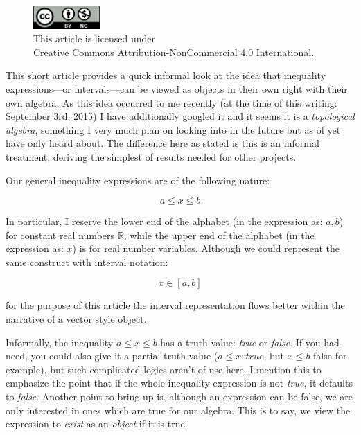 \documentclass[twoside]{article}
\begin{document}
\begin{figure}[h]
\centering
\includegraphics[width=1in]{../../../cc-by-nc.png}\\[0.1in]
\tiny This article is licensed under \\
\href{http://creativecommons.org/licenses/by-nc/4.0/}
{Creative Commons Attribution-NonCommercial 4.0 International.}\\[0.3in]
\end{figure}

This short article provides a quick informal look at the idea that inequality expressions---or intervals---can be viewed
as objects in their own right with their own algebra. As this idea occurred to me recently (at the time of this writing:
September 3rd, 2015) I have additionally googled it and it seems it is a \emph{topological algebra}, something I very much
plan on looking into in the future but as of yet have only heard about. The difference here as stated is this is an informal
treatment, deriving the simplest of results needed for other projects.

Our general inequality expressions are of the following nature:

$$ a\le x\le b $$

In particular, I reserve the lower end of the alphabet (in the expression as: $ a, b $) for constant real numbers $ \mathbb{R} $,
while the upper end of the alphabet (in the expression as: $ x $) is for real number variables. Although we could represent the
same construct with interval notation:

$$ x\in[a,b] $$

for the purpose of this article the interval representation flows better within the narrative of a vector style object.

Informally, the inequality $ a\le x\le b $ has a truth-value: \emph{true} or \emph{false}. If you had need, you could also
give it a partial truth-value ($ a\le x: true $, but $ x\le b $ false for example), but such complicated logics aren't of use
here.  I mention this to emphasize the point that if the whole inequality expression is not \emph{true}, it defaults to
\emph{false}.  Another point to bring up is, although an expression can be false, we are only interested in ones which
are true for our algebra. This is to say, we view the expression to \emph{exist} as an \emph{object} if it is true.
\end{document}
